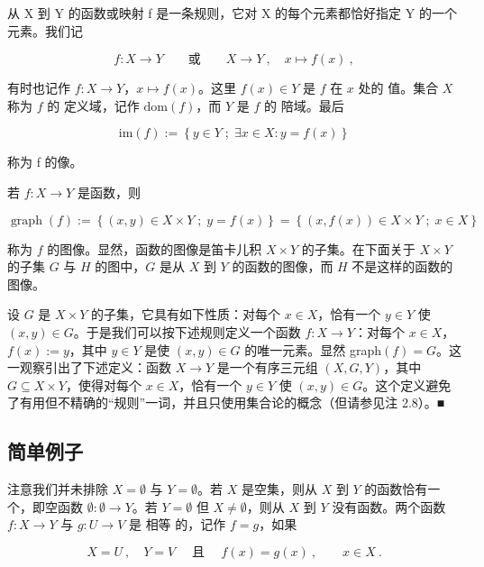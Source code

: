 从 X 到 Y 的函数或映射 f 是一条规则，它对 X 的每个元素都恰好指定 Y 的一个元素。我们记

\[
f\colon X\to Y\qquad\text{或}\qquad X\to Y~,\quad x\mapsto f(x)~,
\]

有时也记作 $f: X \to Y$，$x \mapsto f(x)$。这里 $f(x) \in Y$ 是 $f$ 在 $x$ 处的 $\text{值}$。集合 $X$ 称为 $f$ 的 $\text{定义域}$，记作 $\text{dom}(f)$，而 $Y$ 是 $f$ 的 $\text{陪域}$。最后

\[
\mathrm{im}(f):=\left\{y\in Y\;;\;\exists x\in X\colon y=f(x)\right\}
\]

称为 f 的像。


若 $f: X \to Y$ 是函数，则

\[
\operatorname{g r a p h}(f):=\left\{(x,y)\in X\times Y\;;\;y=f(x)\right\}=\left\{\left(x,f(x)\right)\in X\times Y\;;\;x\in X\right\}
\]

称为 $f$ 的图像。显然，函数的图像是笛卡儿积 $X \times Y$ 的子集。在下面关于 $X \times Y$ 的子集 $G$ 与 $H$ 的图中，$G$ 是从 $X$ 到 $Y$ 的函数的图像，而 $H$ 不是这样的函数的图像。


\begin{remark}

设 $G$ 是 $X \times Y$ 的子集，它具有如下性质：对每个 $x \in X$，恰有一个 $y \in Y$ 使 $(x, y) \in G$。于是我们可以按下述规则定义一个函数 $f: X \to Y$：对每个 $x \in X$，$f(x) := y$，其中 $y \in Y$ 是使 $(x, y) \in G$ 的唯一元素。显然 graph$(f) = G$。这一观察引出了下述定义：函数 $X \to Y$ 是一个有序三元组 $(X, G, Y)$，其中 $G \subseteq X \times Y$，使得对每个 $x \in X$，恰有一个 $y \in Y$ 使 $(x, y) \in G$。这个定义避免了有用但不精确的“规则”一词，并且只使用集合论的概念（但请参见注 2.8）。■

\end{remark}

\subsection*{简单例子}

注意我们并未排除 $X = \emptyset$ 与 $Y = \emptyset$。若 $X$ 是空集，则从 $X$ 到 $Y$ 的函数恰有一个，即空函数 $\emptyset: \emptyset \to Y$。若 $Y = \emptyset$ 但 $X \neq \emptyset$，则从 $X$ 到 $Y$ 没有函数。两个函数 $f: X \to Y$ 与 $g: U \to V$ 是 $\text{相等}$ 的，记作 $f = g$，如果

\[
X=U~,\quad Y=V\quad\text{ 且 }\quad f(x)=g(x)~,\qquad x\in X~.
\]

